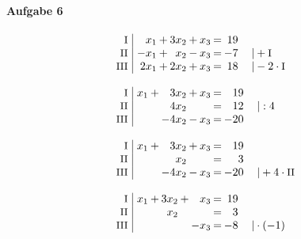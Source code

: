 \paragraph{Aufgabe 6}
\begin{equation*}
\begin{array}{l}
\setlength{\arraycolsep}{1pt}
\begin{array}{r|rcrcrcrl}
    \text{\small I } &\;  x_{1} & + & 3x_{2} & + & x_{3} & = & 19 &                              \\
   \text{\small II } &\; -x_{1} & + &  x_{2} & - & x_{3} & = & -7 & \quad|+\text{\small I}       \\
  \text{\small III } &\; 2x_{1} & + & 2x_{2} & + & x_{3} & = & 18 & \quad|-2\cdot\text{\small I}   
\end{array}
\\ \\
\setlength{\arraycolsep}{1pt}
\begin{array}{r|rcrcrcrl}
    \text{\small I } &\; x_{1} & + &  3x_{2} & + & x_{3} & = &  19 &          \\
   \text{\small II } &\;       &   &  4x_{2} &   &       & = &  12 & \quad|:4 \\
  \text{\small III } &\;       &   & -4x_{2} & - & x_{3} & = & -20 &            
\end{array}
\\ \\
\setlength{\arraycolsep}{1pt}
\begin{array}{r|rcrcrcrl}
    \text{\small I } &\; x_{1} & + &  3x_{2} & + & x_{3} & = &  19 &                               \\
   \text{\small II } &\;       &   &   x_{2} &   &       & = &   3 &                               \\
  \text{\small III } &\;       &   & -4x_{2} & - & x_{3} & = & -20 & \quad|+4\cdot\text{\small II}   
\end{array}
\\ \\
\setlength{\arraycolsep}{1pt}
\begin{array}{r|rcrcrcrl}
    \text{\small I } &\; x_{1} & + & 3x_{2} & + &  x_{3} & = & 19 &                 \\
   \text{\small II } &\;       &   &  x_{2} &   &        & = &  3 &                 \\
  \text{\small III } &\;       &   &        &   & -x_{3} & = & -8 & \quad|\cdot(-1)   
\end{array}
\\ \\

\end{array}
\end{equation*}
